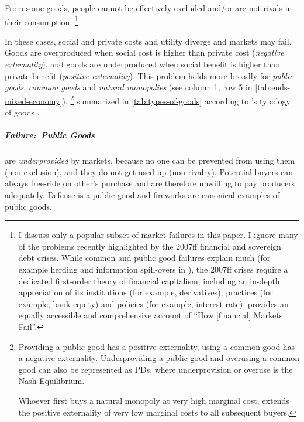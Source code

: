 From some goods, people cannot be effectively excluded and/or are not rivals in their consumption.
\footnote{
	I discuss only a popular subset of market failures in this paper.
	I ignore many of the problems recently highlighted by the 2007ff financial and sovereign debt crises.
	While common and public good failures explain much (for example herding and information spill-overs in \citealt{Banerjee-1992-aa}), the 2007ff crises require a dedicated first-order theory of financial capitalism, including an in-depth appreciation of its institutions (for example, derivatives), practices (for example, bank equity) and policies (for example, interest rate).
	\cite{Cassidy2010} provides an equally accessible and comprehensive account of ``How [financial] Markets Fail''.
}

In these cases, social and private costs and utility diverge and markets may fail.
Goods are overproduced when social cost is higher than private cost (\emph{negative externality}), and goods are underproduced when social benefit is higher than private benefit (\emph{positive externality}).
This problem holds more broadly for \emph{public goods}, \emph{common goods} and \emph{natural monopolies} (see column 1, row 5 in \autoref{tab:ends-mixed-economy}),
\footnote{
	Providing a public good has a positive externality, using a common good has a negative externality.
	Underproviding a public good and overusing a common good can also be represented as \glspl{PD}, where underprovision or overuse is the Nash Equilibrium.

	Whoever first buys a natural monopoly at very high marginal cost, extends the positive externality of very low marginal costs to all subsequent buyers.
}
summarized in \autoref{tab:types-of-goods} according to \citeauthor{Samuelson-1954-eu}'s typology of goods \citeyearpar{Samuelson-1954-eu}.



\subparagraph{Failure:\ Public Goods}
	\label{sec:public-good}
are \emph{underprovided} by markets, because no one can be prevented from using them (non-exclusion), and they do not get used up (non-rivalry).
Potential buyers can always free-ride on other's purchase and are therefore unwilling to pay producers adequately.
Defense is a public good and fireworks are canonical examples of public goods.

